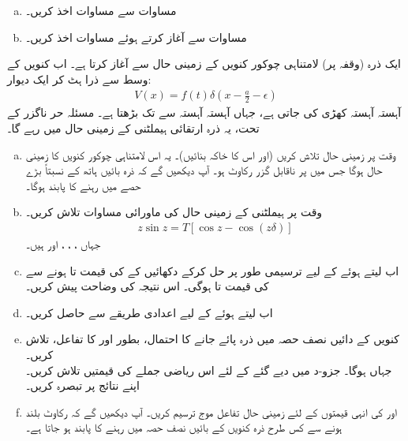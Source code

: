 \begin{enumerate}[a.]
\item
مساوات    سے مساوات  اخذ کریں۔
\item
مساوات    سے آغاز کرتے ہوئے مساوات     اخذ کریں۔
\end{enumerate}


ایک ذرہ     (وقفہ  پر) لامتناہی چوکور کنویں کے زمینی حال سے آغاز کرتا ہے۔ اب کنویں کے وسط  سے ذرا ہٹ کر   ایک دیوار:
\begin{align*}
V (x) = f (t) \delta (x - \frac{a}{2} - \epsilon)
\end{align*}
  آہستہ آہستہ کھڑی کی جاتی ہے، جہاں  آہستہ آہستہ سے  تک بڑھتا ہے۔  مسئلہ حر ناگزر کے تحت،  یہ ذرہ ارتقائی  ہیملٹنی کے زمینی حال میں  رہے گا۔ 
\begin{enumerate}[a.]
\item
وقت  پر زمینی حال تلاش کریں (اور اس  کا خاکہ بنائیں)۔   یہ اس لامتناہی چوکور کنویں کا زمینی حال ہوگا جس میں  پر ناقابل گزر رکاوٹ ہو۔ آپ دیکھیں گے کہ ذرہ بائیں ہاتھ کے نسبتاً بڑے  حصے  میں رہنے کا پابند ہوگا۔ 
\item
وقت  پر ہیملٹنی کے  زمینی حال کی ماورائی مساوات تلاش کریں۔  
\begin{align*}
z \sin z = T [\cos z - \cos (z \delta)]
\end{align*}
جہاں ،  ، ،  اور  ہیں۔ 
\item
اب  لیتے ہوئے  کے لیے ترسیمی طور پر حل کرکے دکھائیں کے  کی قیمت  تا   ہونے سے  کی قیمت  تا  ہوگی۔  اس نتیجہ کی وضاحت پیش کریں۔
\item 
اب  لیتے ہوئے   کے لیے اعدادی طریقے سے    حاصل کریں۔ 
\item
کنویں کے دائیں نصف حصہ میں ذرہ پائے جانے کا احتمال،  بطور  اور  کا تفاعل،  تلاش کریں۔ \\
جہاں  ہوگا۔  جزو-د  میں دیے گئے   کے لئے اس ریاضی  جملے  کی قیمتیں تلاش کریں۔  اپنے نتائج پر تبصرہ کریں۔ 
\item
{} اور  کی انہی قیمتوں کے لئے زمینی حال تفاعل موج ترسیم کریں۔  آپ دیکھیں گے کہ رکاوٹ بلند ہونے سے کس طرح ذرہ کنویں کے بائیں نصف حصہ میں رہنے کا پابند ہو جاتا ہے۔ 
\end{enumerate}
